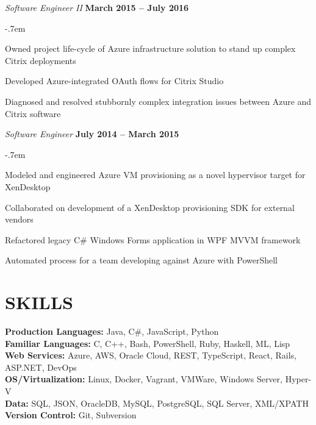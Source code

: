 \documentclass[margin,line]{resume}
\begin{document}
\begin{resume}
    \textsl{Software Engineer II} \hfill \textbf{March 2015 -- July 2016}\\
    \begin{list2}
    \itemsep-.7em
    \item Owned project life-cycle of Azure infrastructure solution to stand up complex Citrix deployments\\
    \item Developed Azure-integrated OAuth flows for Citrix Studio\\
    \item Diagnosed and resolved stubbornly complex integration issues between Azure and Citrix software
    \end{list2}

    \textsl{Software Engineer} \hfill \textbf{July 2014 -- March 2015}\\
    \begin{list2}
    \itemsep-.7em
    \item Modeled and engineered Azure VM provisioning as a novel hypervisor target for XenDesktop\\
    \item Collaborated on development of a XenDesktop provisioning SDK for external vendors\\
    \item Refactored legacy C\# Windows Forms application in WPF MVVM framework\\
    \item Automated process for a team developing against Azure with PowerShell
    \end{list2}


\sectionline

    \section{\mysidestyle \textbf{\large{S}\small{KILLS}}}

    \textbf{Production Languages:} Java, C\#, JavaScript, Python \\
    \textbf{Familiar Languages:} C, C++, Bash, PowerShell, Ruby, Haskell, ML, Lisp\\
    \textbf{Web Services:} Azure, AWS, Oracle Cloud, REST, TypeScript, React, Rails, ASP.NET, DevOps\\
    \textbf{OS/Virtualization:} Linux, Docker, Vagrant, VMWare, Windows Server, Hyper-V\\
    \textbf{Data:} SQL, JSON, OracleDB, MySQL, PostgreSQL, SQL Server, XML/XPATH\\
    \textbf{Version Control:} Git, Subversion


\end{resume}
\end{document}
